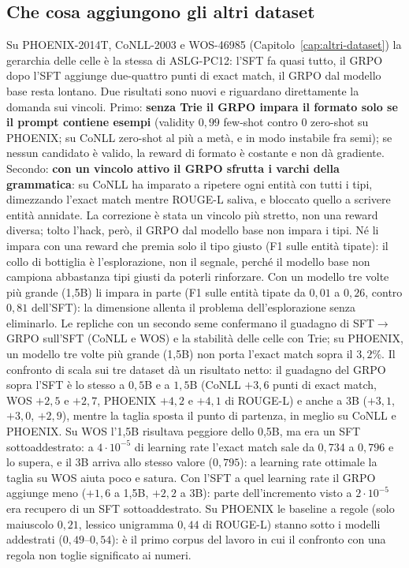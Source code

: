 \subsection{Che cosa aggiungono gli altri dataset}

Su PHOENIX-2014T, CoNLL-2003 e WOS-46985 (Capitolo~\ref{cap:altri-dataset}) la
gerarchia delle celle è la stessa di ASLG-PC12: l'SFT fa quasi tutto, il GRPO
dopo l'SFT aggiunge due-quattro punti di exact match, il GRPO dal modello base
resta lontano. Due risultati sono nuovi e riguardano direttamente la domanda
sui vincoli. Primo: \textbf{senza Trie il GRPO impara il formato solo se il
prompt contiene esempi} (validity $0{,}99$ few-shot contro $0$ zero-shot su
PHOENIX; su CoNLL zero-shot al più a metà, e in modo instabile fra semi); se
nessun candidato è valido, la reward di formato è costante e non dà gradiente.
Secondo: \textbf{con un vincolo attivo il GRPO sfrutta i varchi della
grammatica}: su CoNLL ha imparato a ripetere ogni entità con tutti i tipi,
dimezzando l'exact match mentre ROUGE-L saliva, e bloccato quello a scrivere
entità annidate. La correzione è stata un vincolo più stretto, non una reward
diversa; tolto l'hack, però, il GRPO dal modello base non impara i tipi. Né
li impara con una reward che premia solo il tipo giusto (F1 sulle entità
tipate): il collo di bottiglia è l'esplorazione, non il segnale, perché il
modello base non campiona abbastanza tipi giusti da poterli rinforzare. Con un
modello tre volte più grande (1,5B) li impara in parte (F1 sulle entità tipate
da $0{,}01$ a $0{,}26$, contro $0{,}81$ dell'SFT): la dimensione allenta il
problema dell'esplorazione senza eliminarlo. Le
repliche con un secondo seme confermano il guadagno di SFT$\to$GRPO sull'SFT
(CoNLL e WOS) e la stabilità delle celle con Trie; su PHOENIX, un modello tre
volte più grande (1,5B) non porta l'exact match sopra il $3{,}2\%$. Il
confronto di scala sui tre dataset dà un risultato netto: il guadagno del GRPO
sopra l'SFT è lo stesso a $0{,}5$B e a $1{,}5$B (CoNLL $+3{,}6$ punti di exact
match, WOS $+2{,}5$ e $+2{,}7$, PHOENIX $+4{,}2$ e $+4{,}1$ di ROUGE-L) e anche
a $3$B ($+3{,}1$, $+3{,}0$, $+2{,}9$), mentre la taglia sposta il punto di
partenza, in meglio su CoNLL e PHOENIX. Su WOS l'1,5B risultava peggiore dello
0,5B, ma era un SFT sottoaddestrato: a $4\cdot 10^{-5}$ di learning rate
l'exact match sale da $0{,}734$ a $0{,}796$ e lo supera, e il 3B arriva allo
stesso valore ($0{,}795$): a learning rate ottimale la taglia su WOS aiuta poco
e satura. Con l'SFT a quel learning rate il GRPO aggiunge meno ($+1{,}6$ a 1,5B,
$+2{,}2$ a 3B): parte dell'incremento visto a $2\cdot 10^{-5}$ era recupero di un SFT
sottoaddestrato. Su PHOENIX le baseline a regole (solo maiuscolo $0{,}21$, lessico
unigramma $0{,}44$ di ROUGE-L) stanno sotto i modelli addestrati ($0{,}49$--$0{,}54$):
è il primo corpus del lavoro in cui il confronto con una regola non toglie
significato ai numeri.

